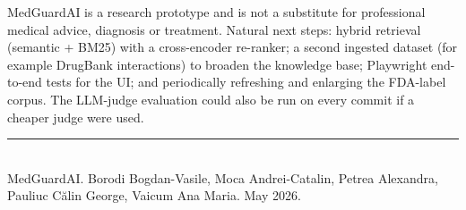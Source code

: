 \documentclass[11pt,a4paper]{article}
\begin{document}
MedGuardAI is a research prototype and is not a substitute for professional medical advice, diagnosis
or treatment. Natural next steps: hybrid retrieval (semantic + BM25) with a cross-encoder re-ranker; a
second ingested dataset (for example DrugBank interactions) to broaden the knowledge base; Playwright
end-to-end tests for the UI; and periodically refreshing and enlarging the FDA-label corpus. The
LLM-judge evaluation could also be run on every commit if a cheaper judge were used.

\vspace{1.2em}
\noindent\rule{\linewidth}{0.4pt}\\[3pt]
{\small\color{medslate}MedGuardAI. Borodi Bogdan-Vasile, Moca Andrei-Catalin, Petrea
Alexandra, Pauliuc C\u{a}lin George, Vaicum Ana Maria. May 2026.}
\end{document}
